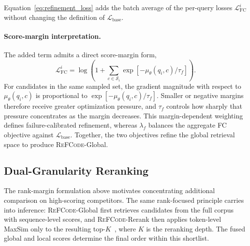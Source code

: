 \documentclass[11pt]{article}
\newcommand{\method}{\textsc{ReFCode}}
\begin{document}
Equation~\ref{eq:refinement_loss} adds the batch average of the per-query losses \(\mathcal{L}_{\mathrm{FC}}^i\) without changing the definition of \(\mathcal{L}_{\mathrm{base}}\).

\paragraph{Score-margin interpretation.}
The added term admits a direct score-margin form,
\begin{equation}
  \mathcal{L}_{\mathrm{FC}}^{i}
  =\log\!\left(1+\sum_{c\in\mathcal{S}_i}
  \exp[-\mu_\theta(q_i,c)/\tau_f]\right).
  \label{eq:margin_loss}
\end{equation}
For candidates in the same sampled set, the gradient magnitude with respect to \(\mu_\theta(q_i,c)\) is proportional to \(\exp[-\mu_\theta(q_i,c)/\tau_f]\). Smaller or negative margins therefore receive greater optimization pressure, and \(\tau_f\) controls how sharply that pressure concentrates as the margin decreases. This margin-dependent weighting defines failure-calibrated refinement, whereas \(\lambda_f\) balances the aggregate FC objective against \(\mathcal{L}_{\mathrm{base}}\). Together, the two objectives refine the global retrieval space to produce \method{}-Global.

\subsection{Dual-Granularity Reranking}
\label{sec:reranking_method}

The rank-margin formulation above motivates concentrating additional comparison on high-scoring competitors. The same rank-focused principle carries into inference: \method{}-Global first retrieves candidates from the full corpus with sequence-level scores, and \method{}-Rerank then applies token-level MaxSim only to the resulting top-\(K\)~\citep{ColBERT}, where \(K\) is the reranking depth. The fused global and local scores determine the final order within this shortlist.
\end{document}
